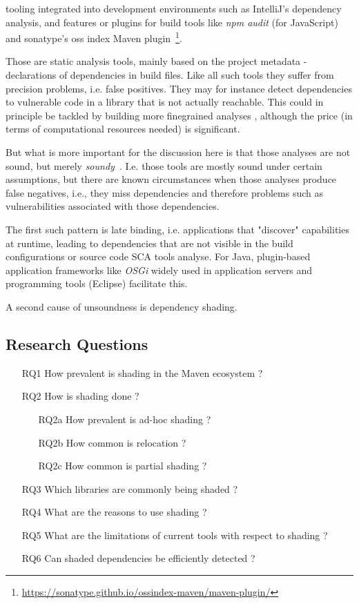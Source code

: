 \documentclass{article}
\begin{document}
 tooling integrated into development environments such as IntelliJ's dependency analysis,  and features or plugins for build tools like \textit{npm audit} (for JavaScript) and sonatype's oss index Maven plugin~\footnote{\url{https://sonatype.github.io/ossindex-maven/maven-plugin/}}.
 
 Those are static analysis tools, mainly based on the project metadata - declarations of dependencies in build files. Like all such tools they suffer from precision problems, i.e. false positives. They may for instance detect dependencies to vulnerable code in a  library that is not actually reachable. This could in principle be tackled by building more finegrained analyses , although the price (in terms of computational resources needed) is significant. 
 
 But what is more  important for the discussion here is that those analyses are not sound, but merely \textit{soundy}~\cite{livshits2015defense}. I.e. those tools are mostly sound under certain assumptions, but there are known circumstances when those analyses produce false negatives, i.e., they miss dependencies and therefore problems such as vulnerabilities associated with those dependencies.
 
 The first such pattern is late binding, i.e. applications that "discover" capabilities at runtime, leading to dependencies that are not visible in the build configurations or source code SCA tools analyse.  For Java, plugin-based application frameworks like \textit{OSGi} widely used in application servers and programming tools (Eclipse) facilitate this.  
 
 A second cause of unsoundness is dependency shading. 


\subsection{Research Questions}

\begin{enumerate}
	\item[RQ1]  How prevalent is shading in the Maven ecosystem ?  
	\item[RQ2] How is shading done ?
	\begin{enumerate}
		\item[RQ2a] How prevalent is ad-hoc shading ?
		\item[RQ2b] How common is relocation ?
		\item[RQ2c] How common is partial shading ?
	\end{enumerate}
	\item[RQ3] Which libraries are commonly being shaded ? 
	\item[RQ4] What are the reasons to use shading ?
	\item[RQ5] What are the limitations of current tools with respect to shading ?
	\item[RQ6] Can shaded dependencies be efficiently detected ? 
\end{enumerate}
\end{document}
